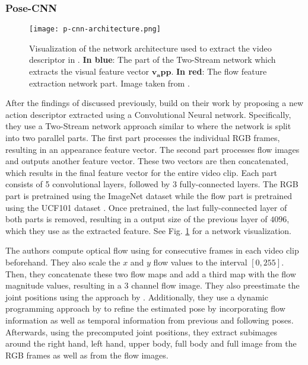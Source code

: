 \subsubsection{Pose-CNN}

\begin{figure}[htb!]
    \centering
    \texttt{[image: p-cnn-architecture.png]}
    \caption{Visualization of the network architecture used to extract the video descriptor in \cite{cheron_pcnn_2015}. \textbf{In blue}: The part of the Two-Stream network which extracts the visual feature vector $\bm{v_app}$. \textbf{In red}: The flow feature extraction network part. Image taken from \cite{cheron_pcnn_2015}. }
    \label{fig:p-cnn-architecture}
\end{figure}

After the findings of \cite{jhuang_towards_2013} discussed previously, \cite{cheron_pcnn_2015} build on their work by proposing a new action descriptor extracted using a Convolutional Neural network.
Specifically, they use a Two-Stream network approach similar to \cite{simonyan_two-stream_2014} where the network is split into two parallel parts.
The first part processes the individual RGB frames, resulting in an appearance feature vector. 
The second part processes flow images and outputs another feature vector. 
These two vectors are then concatenated, which results in the final feature vector for the entire video clip. 
Each part consists of 5 convolutional layers, followed by 3 fully-connected layers. The RGB part is pretrained using the ImageNet dataset \cite{deng_imagenet:_2009} while the flow part is pretrained using the UCF101 dataset \cite{soomro_ucf101:_2012}. 
Once pretrained, the last fully-connected layer of both parts is removed, resulting in a output size of the previous layer of $4096$, which they use as the extracted feature.
See Fig. \ref{fig:p-cnn-architecture} for a network visualization.

The authors compute optical flow using \cite{brox_high_2004} for consecutive frames in each video clip beforehand.
They also scale the $x$ and $y$ flow values to the interval $[0, 255]$.
Then, they concatenate these two flow maps and add a third map with the flow magnitude values, resulting in a $3$ channel flow image.
They also preestimate the joint positions using the approach by \cite{yang_articulated_2011}.
Additionally, they use a dynamic programming approach by \cite{cherian_mixing_2014} to refine the estimated pose by incorporating flow information as well as temporal information from previous and following poses.
Afterwards, using the precomputed joint positions, they extract subimages around the right hand, left hand, upper body, full body and full image from the RGB frames as well as from the flow images.

